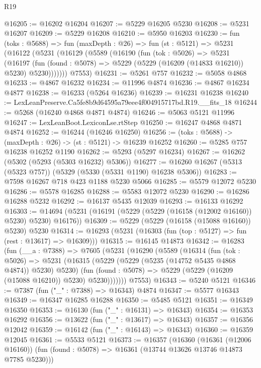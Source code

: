 \begin{lexlean}{R19}
\begin{coremodule}
@16205 := @16202 @16204
@16207 := @5229 @16205 @5230
@16208 := @5231 @16207
@16209 := @5229 @16208
@16210 := @5950 @16203
@16230 := fun (toks : @5688) =>
  fun (maxDepth : @26) =>
  fun (st : @5121) =>
  @5231
    (@16122
      (@5231
        (@16129
          (@5589
            (@16190
              (fun (tok : @5026) =>
              @5231
                (@16197
                  (fun (found : @5078) => @5229 (@5229 (@16209 (@14833 @16210)) @5230) @5230)))))))
      @7553)
@16231 := @5261 @757
@16232 := @5058 @4868
@16233 := @4867 @16232
@16234 := @11996 @4874
@16236 := @4867 @16234 @4877
@16238 := @16233 (@5264 @16236)
@16239 := @16231 @16238
@16240 := LexLeanPreserve.Ca5fe8b9d64595a79eee4f004915717bd.R19.__fits_18
@16244 := @5268 (@16240 @4868 @4871 @4874)
@16246 := @5063 @5121 @11996
@16247 := LexLeanBoot.LexiconLse.rtStep
@16250 := @16247 @4868 @4871 @4874
@16252 := @16244 (@16246 @16250)
@16256 := (toks : @5688) -> (maxDepth : @26) -> (st : @5121) -> @16239 @16252
@16260 := @5285 @757 @16238 @16252 @1190
@16262 := @5293 (@5297 @16234)
@16267 := @16262 (@5302 (@5293 (@5303 @16232) @5306))
@16277 := @16260 @16267 (@5313 (@5323 @757)) (@5329 (@5330 (@5331 @1190) @16238 @5306))
@16283 := @7598 @16267 @718 @423 @1188 @5230 @5066
@16285 := @5579 @12072 @5230
@16286 := @5578 @16285
@16288 := @5583 @12072 @5230
@16290 := @16286 @16288 @5232
@16292 := @16137 @5435 @12039
@16293 := @16133 @16292
@16303 := @14694 (@5231 (@16191 (@5229 (@5229 (@16158 (@12002 @16160)) @5230) @5230) @16176))
@16309 := @5229 (@5229 (@16158 (@15088 @16160)) @5230) @5230
@16314 := @16293 (@5231 (@16303 (fun (top : @5127) => fun (rest : @13617) => @16309)))
@16315 := @16145 @14873
@16342 := @16283
    (fun (__a : @7388) =>
    @7605
      (@5231
        (@16290
          (@5589
            (@16314
              (fun (tok : @5026) =>
              @5231
                (@16315
                  (@5229 (@5229 (@5235 (@14752 @5435 @4868 @4874)) @5230) @5230)
                  (fun (found : @5078) => @5229 (@5229 (@16209 (@15088 @16210)) @5230) @5230)))))))
      @7553)
@16343 := @5240 @5121
@16346 := @7387 (fun ("_" : @7388) => @16343) @4874
@16347 := @5577 @16343
@16349 := @16347 @16285 @16288
@16350 := @5485 @5121
@16351 := @16349 @16350
@16353 := @16130 (fun ("_" : @16131) => @16343)
@16354 := @16353 @16292
@16356 := @13622 (fun ("_" : @13617) => @16343)
@16357 := @16356 @12042
@16359 := @16142 (fun ("_" : @16143) => @16343)
@16360 := @16359 @12045
@16361 := @5533 @5121
@16373 := @16357
    (@16360
      (@16361 (@12006 @16160))
      (fun (found : @5078) => @16361 (@13744 @13626 @13746 @14873 @7785 @5230)))

\end{coremodule}
\end{lexlean}
